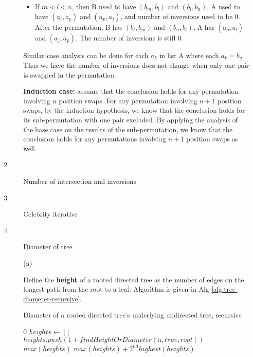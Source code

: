 \documentclass{article}
\begin{document}
\begin{description}
\begin{itemize}
  \item
  If $m < l < n$, then B used to have $(b_m, b_l)$ and $(b_l, b_n)$, A used to have $(a_i, a_p)$ and $(a_p, a_j)$, and number of inversions used to be 0. After the permutation, B has $(b_l, b_m)$ and $(b_n, b_l)$, A has $(a_p, a_i)$ and $(a_j, a_p)$. The number of inversions is still 0.
  \end{itemize}

  Similar case analysis can be done for each $a_k$ in list A where each $a_k = b_q$. Thus we have the number of inversions does not change when only one pair is swapped in the permutation.

  \textbf{Induction case:} assume that the conclusion holds for any permutation involving $n$ position swaps. For any permutation involving $n+1$ position swaps, by the induction hypothesis, we know that the conclusion holds for its sub-permutation with one pair excluded. By applying the analysis of the base case on the results of the sub-permutation, we know that the conclusion holds for any permutations involving $n+1$ position swaps as well.
  

\item[2]{Number of intersection and inversions}

  

\item[3]{Celebrity iterative}

  

\item[4]{Diameter of tree}
  
  (a)

  Define the \textbf{height} of a rooted directed tree as the number of edges on the longest path from the root to a leaf. Algorithm is given in Alg \ref{alg:tree-diameter-recursive}.

  \begin{algorithm}[h]
  \caption{Diameter of a rooted directed tree's underlying undirected tree, recursive}
  \label{alg:tree-diameter-recursive}
    \begin{algorithmic}[1]
        \State \Return $0$
      \EndIf
      \State $heights \gets []$
        \State $heights.push(1 + findHeightOrDiameter(n, true, root))$
      \EndFor
        \State \Return $max(heights)$
      \Else
        \State \Return $max(heights) + 2^{nd}highest(heights)$
      \EndIf
    \EndFunction
    \end{algorithmic}
  \end{algorithm}


\end{description}
\end{document}
